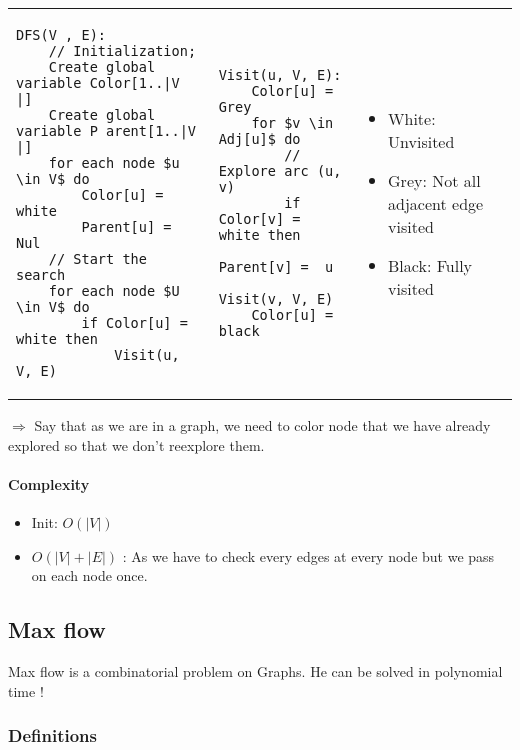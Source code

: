 \begin{tabular}{m{6cm}m{6cm}m{3cm}}
    \begin{lstlisting}
DFS(V , E):
    // Initialization;
    Create global variable Color[1..|V |]
    Create global variable P arent[1..|V |]
    for each node $u \in V$ do 
        Color[u] = white
        Parent[u] = Nul
    // Start the search
    for each node $U \in V$ do
        if Color[u] = white then
            Visit(u, V, E)
    \end{lstlisting}
    &
    \begin{lstlisting}
Visit(u, V, E):
    Color[u] = Grey
    for $v \in Adj[u]$ do
        // Explore arc (u, v)
        if Color[v] = white then
            Parent[v] =  u
            Visit(v, V, E)
    Color[u] = black
    \end{lstlisting}
    &
    \begin{itemize}
        \item White: Unvisited
        \item Grey: Not all adjacent edge visited
        \item Black: Fully visited
        \end{itemize}
\end{tabular}

$\Rightarrow$ Say that as we are in a graph, we need to color node that we have
already explored so that we don't reexplore them. 

\paragraph{Complexity}
\begin{itemize}
    \item Init: $O(|V|)$
    \item $O(|V| + |E|)$ : As we have to check every edges at every node
        but we pass on each node once.
\end{itemize}

\subsection{Max flow}

Max flow is a combinatorial problem on Graphs.
He can be solved in polynomial time !

\subsubsection{Definitions}

